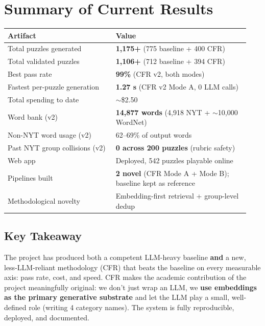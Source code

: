 \documentclass[11pt, letterpaper]{article}
\begin{document}
\section{Summary of Current Results}

\begin{table}[H]
\centering
\small
\begin{tabular}{p{0.42\linewidth} p{0.52\linewidth}}
\toprule
\textbf{Artifact} & \textbf{Value} \\
\midrule
Total puzzles generated             & \textbf{1{,}175+} (775 baseline + 400 CFR) \\
Total validated puzzles             & \textbf{1{,}106+} (712 baseline + 394 CFR) \\
Best pass rate                      & \textbf{99\%} (CFR v2, both modes) \\
Fastest per-puzzle generation       & \textbf{1.27 s} (CFR v2 Mode A, 0 LLM calls) \\
Total spending to date              & $\sim$\$2.50 \\
Word bank (v2)                      & \textbf{14{,}877 words} (4{,}918 NYT + $\sim$10{,}000 WordNet) \\
Non-NYT word usage (v2)             & 62--69\% of output words \\
Past NYT group collisions (v2)      & \textbf{0 across 200 puzzles} (rubric safety) \\
Web app                             & Deployed, 542 puzzles playable online \\
Pipelines built                     & \textbf{2 novel} (CFR Mode A + Mode B); baseline kept as reference \\
Methodological novelty              & Embedding-first retrieval + group-level dedup \\
\bottomrule
\end{tabular}
\end{table}

\subsection*{Key Takeaway}

The project has produced both a competent LLM-heavy baseline \textbf{and} a new,
less-LLM-reliant methodology (CFR) that beats the baseline on every measurable axis:
pass rate, cost, and speed. CFR makes the academic contribution of the project
meaningfully original: we don't just wrap an LLM, we \textbf{use embeddings as
the primary generative substrate} and let the LLM play a small, well-defined role
(writing 4 category names). The system is fully reproducible, deployed, and
documented.
\end{document}
